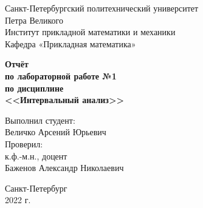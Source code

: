 \thispagestyle{empty}

\begin{center}
\large
Санкт-Петербургский политехнический университет\\
Петра Великого\\
Институт прикладной математики и механики\\
Кафедра «Прикладная математика»\\
\end{center}

\vspace{8em}

\begin{center}
\bfseries
Отчёт\\
по лабораторной работе №1\\
по дисциплине\\
<<Интервальный анализ>>\\
\end{center}

\vspace{8em}

\begin{flushright}
Выполнил студент:\\
Величко Арсений Юрьевич\\
\vspace{2em}
Проверил:\\
к.ф.-м.н., доцент\\
Баженов Александр Николаевич\\
\end{flushright}

\vfill

\begin{center}
Санкт-Петербург\\
2022 г.\\
\end{center}
\newpage